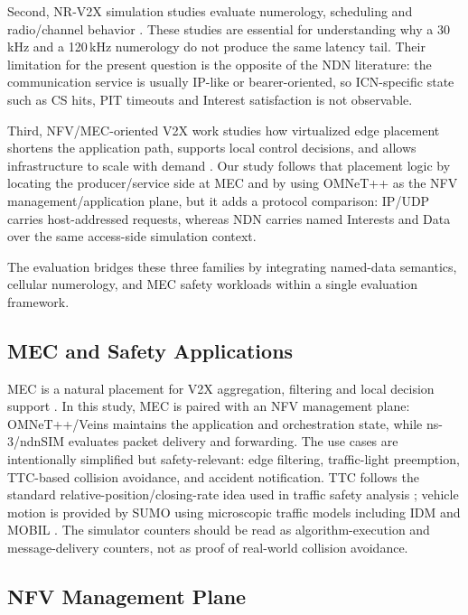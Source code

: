 \documentclass[journal]{IEEEtran}
\begin{document}
Second, NR-V2X simulation studies evaluate numerology, scheduling and radio/channel behavior \cite{ref:cv2x-rel16,ref:ns3-nr}. These studies are essential for understanding why a 30\,kHz and a 120\,kHz numerology do not produce the same latency tail. Their limitation for the present question is the opposite of the NDN literature: the communication service is usually IP-like or bearer-oriented, so ICN-specific state such as CS hits, PIT timeouts and Interest satisfaction is not observable.

Third, NFV/MEC-oriented V2X work studies how virtualized edge placement shortens the application path, supports local control decisions, and allows infrastructure to scale with demand \cite{ref:mec-etsi,ref:mec-v2x-placement}. Our study follows that placement logic by locating the producer/service side at MEC and by using OMNeT++ as the NFV management/application plane, but it adds a protocol comparison: IP/UDP carries host-addressed requests, whereas NDN carries named Interests and Data over the same access-side simulation context.

The evaluation bridges these three families by integrating named-data semantics, cellular numerology, and MEC safety workloads within a single evaluation framework.

\subsection{MEC and Safety Applications}

MEC is a natural placement for V2X aggregation, filtering and local decision support \cite{ref:mec-etsi,ref:mec-v2x-placement}. In this study, MEC is paired with an NFV management plane: OMNeT++/Veins maintains the application and orchestration state, while ns-3/ndnSIM evaluates packet delivery and forwarding. The use cases are intentionally simplified but safety-relevant: edge filtering, traffic-light preemption, TTC-based collision avoidance, and accident notification. TTC follows the standard relative-position/closing-rate idea used in traffic safety analysis \cite{ref:ttc}; vehicle motion is provided by SUMO using microscopic traffic models including IDM and MOBIL \cite{ref:idm,ref:mobil}. The simulator counters should be read as algorithm-execution and message-delivery counters, not as proof of real-world collision avoidance.

\subsection{NFV Management Plane}
\end{document}

